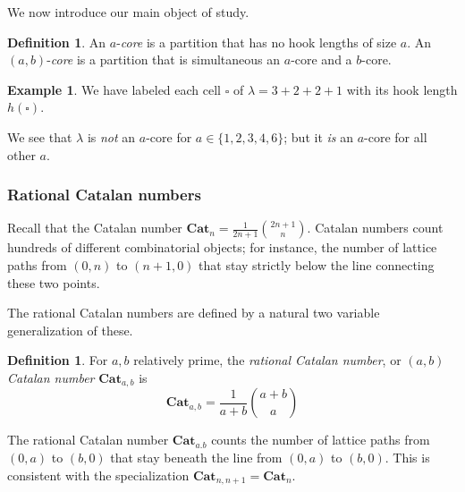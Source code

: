 \documentclass{amsart}[12pt]
\theoremstyle{definition}
\newtheorem{example}[dummy]{Example}
\newtheorem{definition}[dummy]{Definition}
\newcommand{\Cat}{\mathbf{Cat}}
\begin{document}
We now introduce our main object of study.
\begin{definition}
An $a$-\emph{core} is a partition that has no hook lengths of size $a$.  An $(a,b)$-\emph{core} is a partition that is simultaneous an $a$-core and a $b$-core.

\end{definition}


\begin{example}
We have labeled each cell $\square$ of $\lambda=3+2+2+1$ with its hook length $h(\square)$.

\begin{center}
\end{center}
We see that $\lambda$ is \emph{not} an $a$-core for $a\in \{1,2,3,4,6\}$;
but it \emph{is} an $a$-core for all other $a$.
\end{example}

\subsubsection{Rational Catalan numbers}
Recall that the Catalan number $\Cat_n=\frac{1}{2n+1}\binom{2n+1}{n}$.  Catalan numbers count hundreds of different combinatorial objects; for instance, the number of lattice paths from $(0,n)$ to $(n+1,0)$ that stay strictly below the line connecting these two points.

The rational Catalan numbers are defined by a natural two variable generalization of these.
\begin{definition}
For $a,b$ relatively prime, the \emph{rational Catalan number}, or \emph{$(a,b)$ Catalan number} $\Cat_{a,b}$ is 
$$\Cat_{a,b}=\frac{1}{a+b}\binom{a+b}{a}$$ 
\end{definition}

The rational Catalan number $\Cat_{a.b}$ counts the number of lattice paths from $(0,a)$ to $(b,0)$ that stay beneath the line from $(0,a)$ to $(b,0)$.  This is consistent with the specialization $\Cat_{n,n+1}=\Cat_n$.
\end{document}
